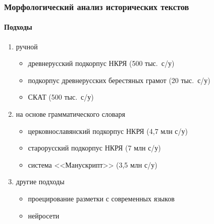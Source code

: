 \begin{frame}
  \frametitle{Морфологический анализ исторических текстов}
  \framesubtitle{Подходы}

  \begin{block}{}
    \begin{enumerate}
      \item ручной \begin{itemize}
        \item древнерусский подкорпус НКРЯ (500 тыс.\ с/у)
        \item подкорпус древнерусских берестяных грамот (20 тыс.\ с/у)
        \item \alert{СКАТ (500 тыс.\ с/у)}
      \end{itemize}
      \item на основе грамматического словаря \begin{itemize}
        \item церковнославянский подкорпус НКРЯ (4,7 млн с/у)
        \item старорусский подкорпус НКРЯ (7 млн с/у)
        \item система <<Манускрипт>> (3,5 млн с/у)
      \end{itemize}
      \item другие подходы \begin{itemize}
        \item проецирование разметки с современных языков
        \item нейросети
      \end{itemize}
    \end{enumerate}
  \end{block}
\end{frame}

